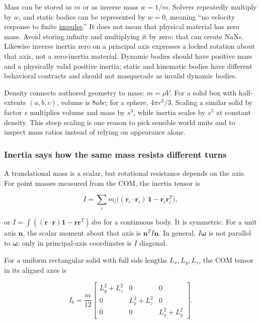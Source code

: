 Mass can be stored as \(m\) or as inverse mass \(w=1/m\). Solvers repeatedly multiply by \(w\), and static bodies can be represented by \(w=0\), meaning ``no velocity response to finite \hyperref[appendix-c39931e6e4c2]{impulse}.'' It does not mean that physical material has zero mass. Avoid storing infinity and multiplying it by zero: that can create NaNs. Likewise inverse inertia zero on a principal axis expresses a locked rotation about that axis, not a zero-inertia material. Dynamic bodies should have positive mass and a physically valid positive inertia; static and kinematic bodies have different behavioral contracts and should not masquerade as invalid dynamic bodies.

Density connects authored geometry to mass: \(m=\rho V\). For a solid box with half-extents \((a,b,c)\), volume is \(8abc\); for a sphere, \(4\pi r^3/3\). Scaling a similar solid by factor \(s\) multiplies volume and mass by \(s^3\), while inertia scales by \(s^5\) at constant density. This steep scaling is one reason to pick sensible world units and to inspect mass ratios instead of relying on appearance alone.

\subsubsection{Inertia says how the same mass resists different turns}\label{inertia-says-how-the-same-mass-resists-different-turns}

A translational mass is a scalar, but rotational resistance depends on the axis. For point masses measured from the COM, the inertia tensor is

\[
I=\sum_i m_i\big((\mathbf r_i\cdot\mathbf r_i)\,\mathbf 1-\mathbf r_i\mathbf r_i^T\big),
\]

or \(I=\int((\mathbf r\cdot\mathbf r)\mathbf 1-\mathbf r\mathbf r^T)\,dm\) for a continuous body. It is symmetric. For a unit axis \(\mathbf n\), the scalar moment about that axis is \(\mathbf n^T I\mathbf n\). In general, \(I\boldsymbol\omega\) is not parallel to \(\boldsymbol\omega\); only in principal-axis coordinates is \(I\) diagonal.

For a uniform rectangular solid with full side lengths \(L_x,L_y,L_z\), the COM tensor in its aligned axes is

\[
I_b=\frac{m}{12}\begin{bmatrix}L_y^2+L_z^2&0&0\\0&L_x^2+L_z^2&0\\0&0&L_x^2+L_y^2\end{bmatrix}.
\]

